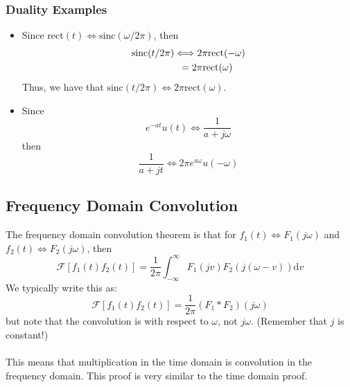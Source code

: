 \documentclass[10pt]{article}
\newcommand{\sinc}{\text{sinc}}
\newcommand{\rect}{\text{rect}}
\begin{document}
\subsubsection*{Duality Examples}
\begin{itemize}
    \item Since $\rect(t) \Longleftrightarrow \sinc(\omega/2\pi)$, then
    \begin{align*}
        \sinc(t/2\pi) &\Longleftrightarrow 2\pi \rect(-\omega)\\
        &\hspace{0.18cm}= 2\pi \rect(\omega)
    \end{align*}
    Thus, we have that $\sinc(t/2\pi) \Longleftrightarrow 2\pi \rect(\omega)$.
    \item Since
    \[e^{-at} u(t) \Longleftrightarrow \frac{1}{a+j\omega}\]
    then 
    \[\frac{1}{a+jt} \Longleftrightarrow 2\pi e^{a\omega} u(-\omega)\]
\end{itemize}

\subsection*{Frequency Domain Convolution}
The frequency domain convolution theorem is that for $f_1(t) \Longleftrightarrow F_1(j\omega)$ and $f_2(t) \Longleftrightarrow F_2(j\omega)$, then
\[\boxed{\mathcal{F}[f_1(t)f_2(t)] = \frac{1}{2\pi} \int_{-\infty}^\infty F_1(jv) F_2(j(\omega - v)) \text{d}v}\]
We typically write this as:
\[\boxed{\mathcal{F}[f_1(t)f_2(t)] = \frac{1}{2\pi} (F_1 * F_2)(j\omega)}\]
but note that the convolution is with respect to $\omega$, not $j\omega$.  (Remember that $j$ is constant!)\\\\
This means that multiplication in the time domain is convolution in the frequency domain.  This proof is very similar to the time domain proof.
\end{document}
